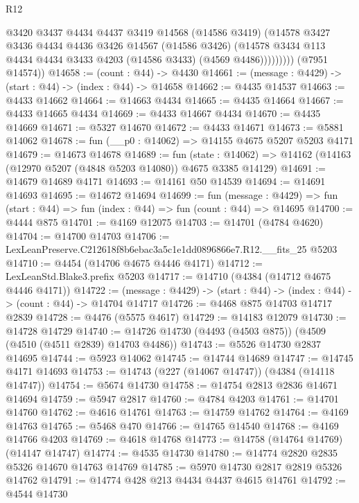\begin{lexlean}{R12}
\begin{coremodule}
                  @3420
                  @3437
                  @4434
                  @4437
                  @3419
                  @14568
                  (@14586 @3419)
                  (@14578
                    @3427
                    @3436
                    @4434
                    @4436
                    @3426
                    @14567
                    (@14586 @3426)
                    (@14578 @3434 @113 @4434 @4434 @3433 @4203 (@14586 @3433) (@4569 @4486)))))))))
      (@7951 @14574))
@14658 := (count : @44) -> @4430
@14661 := (message : @4429) -> (start : @44) -> (index : @44) -> @14658
@14662 := @4435 @14537
@14663 := @4433 @14662
@14664 := @14663 @4434
@14665 := @4435 @14664
@14667 := @4433 @14665 @4434
@14669 := @4433 @14667 @4434
@14670 := @4435 @14669
@14671 := @5327 @14670
@14672 := @4433 @14671
@14673 := @5881 @14062
@14678 := fun (__p0 : @14062) => @14155 @4675 @5207 @5203 @4171
@14679 := @14673 @14678
@14689 := fun (state : @14062) =>
  @14162 (@14163 (@12970 @5207 (@4848 @5203 @14080)) @4675 @3385 @14129)
@14691 := @14679 @14689 @4171
@14693 := @14161 @50 @14539
@14694 := @14691 @14693
@14695 := @14672 @14694
@14699 := fun (message : @4429) =>
  fun (start : @44) => fun (index : @44) => fun (count : @44) => @14695
@14700 := @4444 @875
@14701 := @4169 @12075
@14703 := @14701 (@4784 @4620)
@14704 := @14700 @14703
@14706 := LexLeanPreserve.C212618f8b6ebac3a5c1e1dd0896866e7.R12.__fits_25 @5203
@14710 := @4454 (@14706 @4675 @4446 @4171)
@14712 := LexLeanStd.Blake3.prefix @5203
@14717 := @14710 (@4384 (@14712 @4675 @4446 @4171))
@14722 := (message : @4429) -> (start : @44) -> (index : @44) -> (count : @44) -> @14704 @14717
@14726 := @4468 @875 @14703 @14717 @2839
@14728 := @4476 (@5575 @4617)
@14729 := @14183 @12079
@14730 := @14728 @14729
@14740 := @14726 @14730 (@4493 (@4503 @875)) (@4509 (@4510 (@4511 @2839) @14703 @4486))
@14743 := @5526 @14730 @2837 @14695
@14744 := @5923 @14062
@14745 := @14744 @14689
@14747 := @14745 @4171 @14693
@14753 := @14743 (@227 (@14067 @14747)) (@4384 (@14118 @14747))
@14754 := @5674 @14730
@14758 := @14754 @2813 @2836 @14671 @14694
@14759 := @5947 @2817
@14760 := @4784 @4203
@14761 := @14701 @14760
@14762 := @4616 @14761
@14763 := @14759 @14762
@14764 := @4169 @14763
@14765 := @5468 @470
@14766 := @14765 @14540
@14768 := @4169 @14766 @4203
@14769 := @4618 @14768
@14773 := @14758 (@14764 @14769) (@14147 @14747)
@14774 := @4535 @14730
@14780 := @14774 @2820 @2835 @5326 @14670 @14763 @14769
@14785 := @5970 @14730 @2817 @2819 @5326 @14762
@14791 := @14774 @428 @213 @4434 @4437 @4615 @14761
@14792 := @4544 @14730

\end{coremodule}
\end{lexlean}
